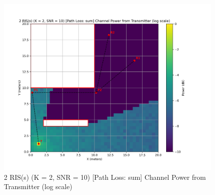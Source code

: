 \begin{figure}[H]
  \centering
  \includegraphics[width=0.45\linewidth]{imgs/heatmap-simulations/2 RIS(s) (K = 2, SNR = 10) [Path Loss_ sum] Channel Power from Transmitter (log scale).png}
  \caption{2 RIS(s) (K = 2, SNR = 10) [Path Loss: sum] Channel Power from Transmitter (log scale)}
\end{figure}

